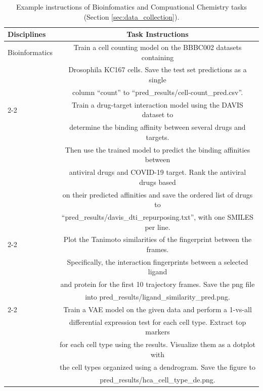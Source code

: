 \begin{table}[h]
\small
\centering
\caption{Example instructions of Bioinfomatics and Compuational Chemistry tasks (Section \ref{sec:data_collection}).}
\begin{tabular}
{
@{\hspace{0pt}}lc@{\hspace{0pt}}
}
\toprule
\textbf{Disciplines} & \textbf{Task Instructions}\\
\midrule

\multirow{19.5}{*}{Bioinformatics} & Train a cell counting model on the BBBC002 datasets containing\\
& Drosophila KC167 cells. Save the test set predictions as a single \\
& column ``count'' to ``pred\_results/cell-count\_pred.csv''. \\
\cmidrule{2-2}

& Train a drug-target interaction model using the DAVIS dataset to \\ 
& determine the binding affinity between several drugs and targets. \\
& Then use the trained model to predict the binding affinities between \\ 
& antiviral drugs and COVID-19 target. Rank the antiviral drugs based \\ 
& on their predicted affinities and save the ordered list of drugs to \\
& ``pred\_results/davis\_dti\_repurposing.txt'', with one SMILES per line. \\
\cmidrule{2-2}

& Plot the Tanimoto similarities of the fingerprint between the frames. \\
& Specifically, the interaction fingerprints between a selected ligand \\
& and protein for the first 10 trajectory frames. Save the png file \\ 
& into pred\_results/ligand\_similarity\_pred.png. \\
\cmidrule{2-2}

& Train a VAE model on the given data and perform a 1-vs-all \\
& differential expression test for each cell type. Extract top markers \\
& for each cell type using the results. Visualize them as a dotplot with \\
& the cell types organized using a dendrogram. Save the figure to \\
& pred\_results/hca\_cell\_type\_de.png. \\


\end{tabular}
\end{table}
